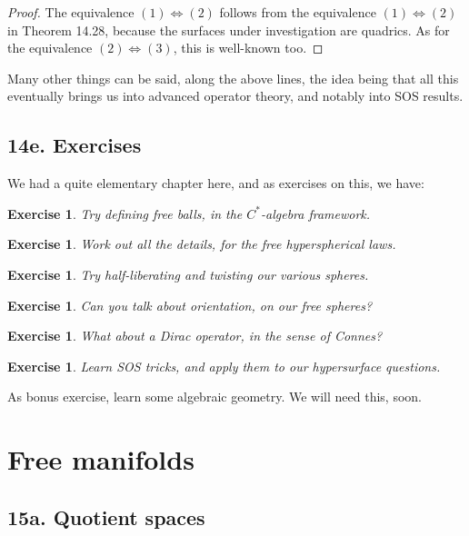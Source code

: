 \documentclass[12pt]{amsbook}
\newtheorem{exercise}[theorem]{Exercise}
\begin{document}
\begin{proof}
The equivalence $(1)\iff(2)$ follows from the equivalence $(1)\iff(2)$ in Theorem 14.28, because the surfaces under investigation are quadrics. As for the equivalence $(2)\iff(3)$, this is well-known too.
\end{proof}


Many other things can be said, along the above lines, the idea being that all this eventually brings us into advanced operator theory, and notably into SOS results.

\section*{14e. Exercises}

We had a quite elementary chapter here, and as exercises on this, we have:

\begin{exercise}
Try defining free balls, in the $C^*$-algebra framework.
\end{exercise}

\begin{exercise}
Work out all the details, for the free hyperspherical laws.
\end{exercise}

\begin{exercise}
Try half-liberating and twisting our various spheres.
\end{exercise}

\begin{exercise}
Can you talk about orientation, on our free spheres?
\end{exercise}

\begin{exercise}
What about a Dirac operator, in the sense of Connes?
\end{exercise}

\begin{exercise}
Learn SOS tricks, and apply them to our hypersurface questions.
\end{exercise}

As bonus exercise, learn some algebraic geometry. We will need this, soon.

\chapter{Free manifolds}

\section*{15a. Quotient spaces}
\end{document}
